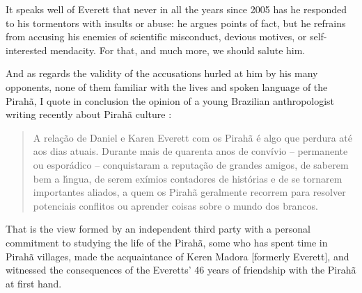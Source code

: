 \documentclass[output=paper,colorlinks,citecolor=brown
]{langscibook}
\begin{document}
It speaks well of Everett that never in all the years since 2005 has
he responded to his tormentors with insults or abuse: he argues points
of fact, but he refrains from accusing his enemies of scientific
misconduct, devious motives, or self-interested mendacity. For that,
and much more, we should salute him.

And as regards the validity of the accusations hurled at him by his
many opponents, none of them familiar with the lives and spoken
language of the Pirah{\~a}, I quote in conclusion the opinion of a
young Brazilian anthropologist writing recently about Pirah{\~a}
culture \citep[59]{Felizes23}:
\begin{quote}
A rela{\c{c}}{\~a}o de Daniel e Karen Everett com os Pirah{\~a} {\'e}
algo que perdura at{\'e} aos dias atuais. Durante mais de quarenta
anos de convívio – permanente ou espor{\'a}dico – conquistaram a
reputa{\c{c}}{\~a}o de grandes amigos, de saberem bem a l{\'\i}ngua, de
serem exímios contadores de histórias e de se tornarem importantes
aliados, a quem os Pirah{\~a} geralmente recorrem para resolver
potenciais conflitos ou aprender coisas sobre o mundo dos brancos.

\end{quote}
That is the view formed by an independent third party with a personal
commitment to studying the life of the Pirah{\~a}, some who has spent time
in Pirah{\~a} villages, made the acquaintance of Keren Madora [formerly
Everett], and witnessed the consequences of the Everetts' 46 years of
friendship with the Pirah{\~a} at first hand.
\end{document}
